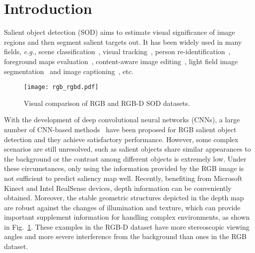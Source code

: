 \documentclass[runningheads]{llncs}
\begin{document}
\section{Introduction}
Salient object detection (SOD) aims to estimate  visual significance of image regions and then segment salient targets out. It has been widely used in many fields, \textit{e.g.}, scene classification~\cite{classification}, visual tracking~\cite{tracking}, person re-identification~\cite{Reid}, foreground maps evaluation~\cite{S-m}, content-aware image editing~\cite{image_editing}, light field image segmentation~\cite{LFSD_CNNs} and image captioning~\cite{Imagecaption}, etc.
\begin{figure}[t]
\centering
\texttt{[image: rgb\_rgbd.pdf]}\\
\caption{Visual comparison of RGB and RGB-D SOD datasets.}
\label{fig:RGB_RGBD_Datasets}
\end{figure}

With the development of deep convolutional neural networks (CNNs), a large number of CNN-based methods~\cite{RFCN,Amulet,SRM,DGRL,BMPM,RAS,PAGRN,HRS,PASE,BASNet,CTBIN,MINet,GateNet} have been proposed for RGB salient object detection and they achieve satisfactory performance. However,  some complex scenarios are still unresolved, such as salient objects share similar appearances to the background or the contrast among different objects is extremely low. Under these circumstances, only using the information provided by the RGB image is not sufficient to predict saliency map well. Recently, benefiting from Microsoft Kinect and Intel RealSense devices, depth information can be conveniently obtained. Moreover, the stable geometric structures depicted in the depth map are robust against the changes of illumination and texture, which can provide important supplement information for handling complex environments, as shown in Fig.~\ref{fig:RGB_RGBD_Datasets}. These examples in the RGB-D dataset have more stereoscopic viewing angles and more severe interference from the background than ones in the RGB dataset. 
\end{document}
